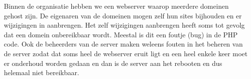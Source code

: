 Binnen de organisatie hebben we een webserver waarop meerdere domeinen gehost zijn. De eigenaren van de domeinen mogen zelf hun sites bijhouden en er wijzigingen in aanbrengen. Het zelf wijzigingen aanbrengen heeft soms tot gevolg dat een domein onbereikbaar wordt. Meestal is dit een foutje (bug) in de PHP code. Ook de beheerders van de server maken weleens fouten in het beheren van de server zodat dat soms heel de webserver eruit ligt en een heel enkele keer moet er onderhoud worden gedaan en dan is de server aan het rebooten en dus helemaal niet bereikbaar.

